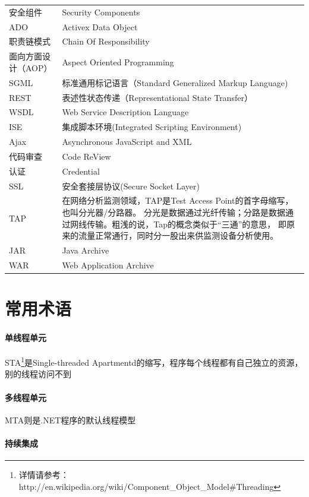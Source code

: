 \documentclass{book}
\begin{document}
\begin{longtable}{lp{10cm}}
	安全组件 & Security Components\\
	ADO & Activex Data Object\\
	职责链模式 & Chain Of Responsibility\\
	面向方面设计（AOP） & Aspect Oriented Programming\\
	SGML & 标准通用标记语言（Standard Generalized Markup Language)\\
	REST & 表述性状态传递（Representational State Transfer）\\
	WSDL & Web Service Description Language \\
	ISE & 集成脚本环境(Integrated Scripting Environment)\\
	Ajax & Asynchronous JavaScript and XML\\
	代码审查 & Code ReView\\
	认证 & Credential\\
	SSL & 安全套接层协议(Secure Socket Layer)\\
	TAP & 在网络分析监测领域，TAP是Test Access Point的首字母缩写，也叫分光器/分路器。
	分光是数据通过光纤传输；分路是数据通过网线传输。粗浅的说，Tap的概念类似于“三通”的意思，
	即原来的流量正常通行，同时分一股出来供监测设备分析使用。\\
	JAR & Java Archive\\
	WAR & Web Application Archive\\
\end{longtable}

\section{常用术语}

\paragraph{单线程单元}  STA\footnote{详情请参考：http://en.wikipedia.org/wiki/Component\_Object\_Model\#Threading}是Single-threaded Apartmentd的缩写，程序每个线程都有自己独立的资源，别的线程访问不到   


\paragraph{多线程单元}MTA则是.NET程序的默认线程模型   

\paragraph{持续集成}
\end{document}

